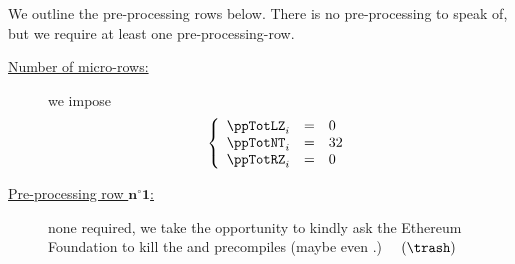 \begin{center}
\end{center}
We outline the pre-processing rows below.
There is no pre-processing to speak of, but we require at least one pre-processing-row.
\begin{description}
	\item[\underline{Number of micro-rows:}]
		we impose
		\[
			\left\{ \begin{array}{lcl}
				\ppTotLZ    _{i}     & = & 0 \\ 
				\ppTotNT    _{i}     & = & 32 \\ 
				\ppTotRZ    _{i}     & = & 0 \\ 
			\end{array} \right.
		\]
	\item[\underline{Pre-processing row $\bm{n^\circ 1}$:}] 
		none required, we take the opportunity to kindly ask the Ethereum Foundation to kill the \instBlake{} and \instRipemd{} precompiles \faSmileO{} (maybe even \instModexp{}.) $\quad(\trash)$
\end{description}
